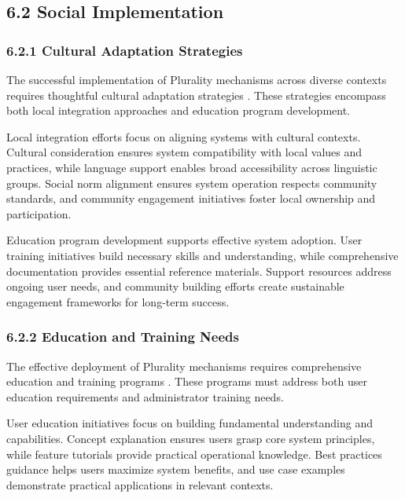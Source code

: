 \hypertarget{social-implementation}{%
\subsection{6.2 Social Implementation}\label{social-implementation}}

\hypertarget{cultural-adaptation-strategies}{%
\subsubsection{6.2.1 Cultural Adaptation Strategies}\label{cultural-adaptation-strategies}}

The successful implementation of Plurality mechanisms across diverse contexts requires thoughtful cultural adaptation strategies \citep{vtaiwan2023}. These strategies encompass both local integration approaches and education program development.

Local integration efforts focus on aligning systems with cultural contexts. Cultural consideration ensures system compatibility with local values and practices, while language support enables broad accessibility across linguistic groups. Social norm alignment ensures system operation respects community standards, and community engagement initiatives foster local ownership and participation.

Education program development supports effective system adoption. User training initiatives build necessary skills and understanding, while comprehensive documentation provides essential reference materials. Support resources address ongoing user needs, and community building efforts create sustainable engagement frameworks for long-term success.

\hypertarget{education-and-training-needs}{%
\subsubsection{6.2.2 Education and Training Needs}\label{education-and-training-needs}}

The effective deployment of Plurality mechanisms requires comprehensive education and training programs \citep{pdis2024}. These programs must address both user education requirements and administrator training needs.

User education initiatives focus on building fundamental understanding and capabilities. Concept explanation ensures users grasp core system principles, while feature tutorials provide practical operational knowledge. Best practices guidance helps users maximize system benefits, and use case examples demonstrate practical applications in relevant contexts.

